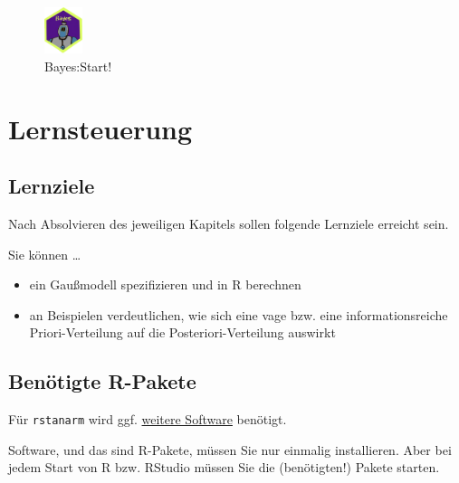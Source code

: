 \documentclass[
  a4paper,
  DIV=11]{scrreprt}
\providecommand{\tightlist}{%
  \setlength{\itemsep}{0pt}\setlength{\parskip}{0pt}}\usepackage{longtable,booktabs,array}
\theoremstyle{definition}
\theoremstyle{remark}
\begin{document}
\begin{figure}

{\centering \includegraphics[width=0.1\textwidth,height=\textheight]{./img/Golem_hex.png}

}

\caption{Bayes:Start!}

\end{figure}

\hypertarget{lernsteuerung-6}{%
\section{Lernsteuerung}\label{lernsteuerung-6}}

\hypertarget{lernziele-7}{%
\subsection{Lernziele}\label{lernziele-7}}

Nach Absolvieren des jeweiligen Kapitels sollen folgende Lernziele
erreicht sein.

Sie können \ldots{}

\begin{itemize}
\tightlist
\item
  ein Gaußmodell spezifizieren und in R berechnen
\item
  an Beispielen verdeutlichen, wie sich eine vage bzw. eine
  informationsreiche Priori-Verteilung auf die Posteriori-Verteilung
  auswirkt
\end{itemize}

\hypertarget{benuxf6tigte-r-pakete-4}{%
\subsection{Benötigte R-Pakete}\label{benuxf6tigte-r-pakete-4}}

Für \texttt{rstanarm} wird ggf.
\href{https://github.com/stan-dev/rstan/wiki/RStan-Getting-Started}{weitere
Software} benötigt.

\begin{tcolorbox}[enhanced jigsaw, title=\textcolor{quarto-callout-note-color}{\faInfo}\hspace{0.5em}{Hinweis}, bottomtitle=1mm, bottomrule=.15mm, titlerule=0mm, colbacktitle=quarto-callout-note-color!10!white, colframe=quarto-callout-note-color-frame, leftrule=.75mm, left=2mm, toprule=.15mm, colback=white, arc=.35mm, breakable, toptitle=1mm, opacityback=0, rightrule=.15mm, coltitle=black, opacitybacktitle=0.6]

Software, und das sind R-Pakete, müssen Sie nur einmalig installieren.
Aber bei jedem Start von R bzw. RStudio müssen Sie die (benötigten!)
Pakete starten.

\end{tcolorbox}
\end{document}
